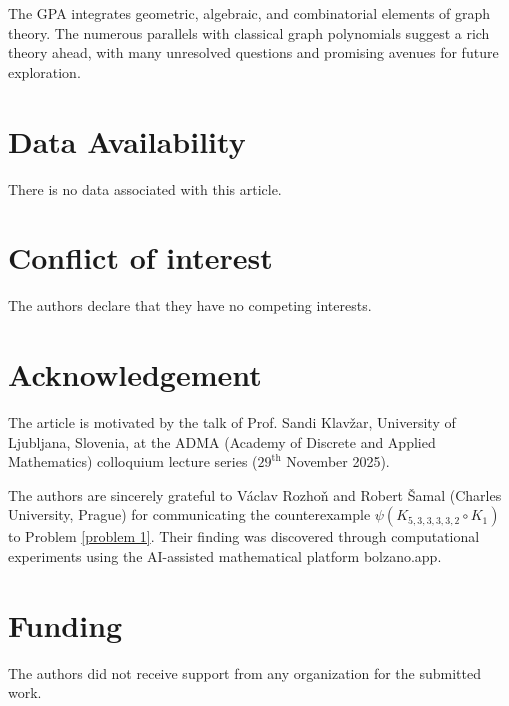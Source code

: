 \documentclass[12pt,twoside]{article}
\begin{document}
The GPA integrates geometric, algebraic, and combinatorial elements of graph theory.  The numerous parallels with classical
graph polynomials suggest a rich theory ahead, with many unresolved questions and promising avenues for future exploration.

	
	\bigskip
	\section*{Data Availability}
	There is no data associated with this article.
	\section*{Conflict of interest}
	The authors declare that they have no competing interests.
	\section*{Acknowledgement}
	The article is motivated by the talk of Prof. Sandi Klavžar, University of Ljubljana, Slovenia, at the ADMA (Academy of Discrete and Applied Mathematics) colloquium lecture series ($29^{\text{th}}$ November 2025).
	
	\medskip\noindent The authors are sincerely grateful to Václav Rozhoň and Robert Šamal (Charles University, Prague) for communicating the counterexample $\psi(K_{5,3,3,3,3,2}\circ K_1)$ to Problem \ref{problem 1}. Their finding was discovered through computational experiments using the AI-assisted mathematical platform bolzano.app.
	\section*{Funding}
	The authors did not receive support from any organization for the submitted work.
	
\end{document}
